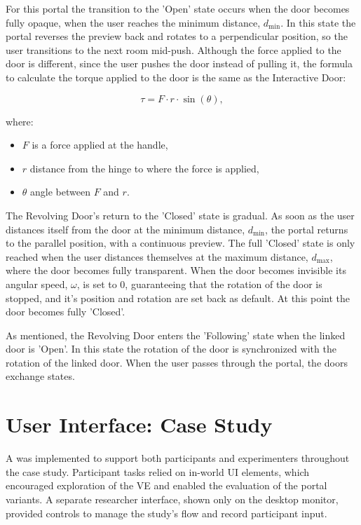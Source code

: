 For this portal the transition to the 'Open' state occurs when the door becomes fully opaque, when the user reaches the minimum distance, $d_{\min}$.
In this state the portal reverses the preview back and rotates to a perpendicular position, so the user transitions to the next room mid-push.
Although the force applied to the door is different, since the user pushes the door instead of pulling it, the formula to calculate the 
torque applied to the door is the same as the Interactive Door:

\[
\tau = F \cdot r \cdot \sin(\theta),
\]

where:
\begin{itemize}
  \item \(F\) is a force applied at the handle,
  \item \(r\) distance from the hinge to where the force is applied,
  \item $\theta$ angle between \(F\) and \(r\).
\end{itemize}

The Revolving Door's return to the 'Closed' state is gradual. As soon as the user distances itself from the door at the minimum distance, $d_{\min}$,
the portal returns to the parallel position, with a continuous preview. The full 'Closed' state is only reached when the user distances themselves 
at the maximum distance, $d_{\max}$, where the door becomes fully transparent. When the door becomes invisible its angular speed, $\omega$,
is set to 0, guaranteeing that the rotation of the door is stopped, and it's position and rotation are set back as default. At this point the door 
becomes fully 'Closed'.

As mentioned, the Revolving Door enters the 'Following' state when the linked door is 'Open'. In this state the rotation of the door is synchronized
with the rotation of the linked door. When the user passes through the portal, the doors exchange states.



\section{User Interface: Case Study}
\label{sec:ui}

A  was implemented to support both participants and experimenters throughout the case study. 
Participant tasks relied on in-world \gls{UI} elements, which encouraged exploration of the \gls{VE} and enabled 
the evaluation of the portal variants. A separate researcher interface, shown only on the desktop monitor, 
provided controls to manage the study's flow and record participant input.


